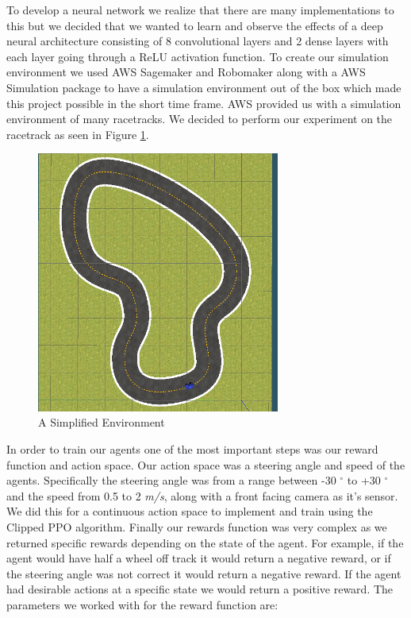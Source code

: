 \documentclass[journal]{IEEEtran}
\begin{document}
To develop a neural network we realize that there are many implementations to this but we decided that we wanted to learn and observe the effects of a deep neural architecture consisting of 8 convolutional layers and 2 dense layers with each layer going through a ReLU activation function.  To create our simulation environment we used AWS Sagemaker and Robomaker along with a AWS Simulation package to have a simulation environment out of the box which made this project possible in the short time frame.  AWS provided us with a simulation environment of many racetracks.  We decided to perform our experiment on the racetrack as seen in Figure \ref{reinvent}.

\begin{figure}[htbp]
\begin{center}
\includegraphics[width=8cm]{training_track}
\end{center}
\vspace{-2mm}
\caption{A Simplified Environment}
\label{reinvent}
\end{figure}

In order to train our agents one of the most important steps was our reward function and action space.  Our action space was a steering angle and speed of the agents.  Specifically the steering angle was from a range between -30 $^{\circ}$ to +30 $^{\circ}$ and the speed from 0.5 to 2 \emph{m/s}, along with a front facing camera as it's sensor.  We did this for a continuous action space to implement and train using the Clipped PPO algorithm.  Finally our rewards function was very complex as we returned specific rewards depending on the state of the agent.  For example, if the agent would have half a wheel off track it would return a negative reward, or if the steering angle was not correct it would return a negative reward.  If the agent had desirable actions at a specific state we would return a positive reward.  The parameters we worked with for the reward function are:
\end{document}
